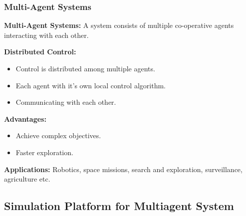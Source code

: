 \documentclass[10pt]{beamer}
\begin{document}
\begin{frame}
	\frametitle{Multi-Agent Systems}

	\begin{block}{\textbf{Multi-Agent Systems:}}
		\justifying  A system consists of multiple co-operative agents interacting with each other.
		\vspace*{0.1 cm}
	\end{block}

	\begin{block}{\textbf{Distributed Control:}}

		\begin{itemize}
			\item Control is distributed among multiple agents.
			\item Each agent with it's own local control algorithm.
			\item Communicating with each other.
		\end{itemize}
		\vspace*{0.1 cm}
	\end{block}
	\pause
	\begin{block}{\textbf{Advantages:}}

		\begin{itemize}
			\item Achieve complex objectives.
			\item Faster exploration.
		\end{itemize}
		\vspace*{0.1 cm}
	\end{block}
	\pause
	\begin{block}{\textbf{Applications:}}
		Robotics, space missions, search and exploration, surveillance, agriculture etc.
	\end{block}



\end{frame}
\subsection*{Simulation Platform for Multiagent System}
\end{document}
